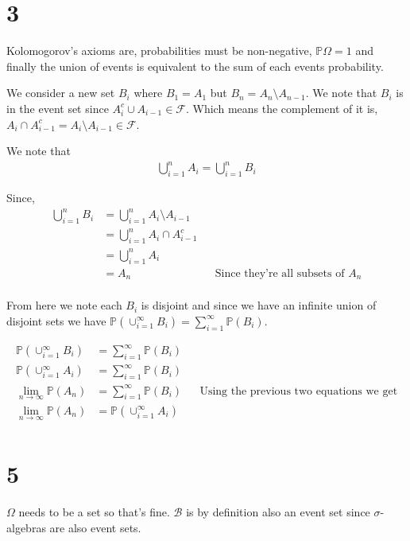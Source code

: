 \documentclass{article}
\newcommand{\prob}{\mathbb{P}}
\begin{document}
\section{3}
Kolomogorov's axioms are,
probabilities must be non-negative,
$\prob{\Omega} = 1$ and finally the union of events
is equivalent to the sum of each events probability.

We consider a new set $B_i$ where $B_1 = A_1$ but $B_n = A_n \setminus A_{n-1}$.
We note that $B_i$ is in the event set since $A_i^c \cup A_{i-1} \in \mathcal{F}$.
Which means the complement of it is, $A_i \cap A_{i-1}^c = A_i \setminus A_{i-1} \in \mathcal{F}$.

We note that 
\begin{align*}
    \bigcup_{i=1}^n A_i = \bigcup_{i=1}^n B_i
\end{align*}

Since,
\begin{align*}
    \bigcup_{i=1}^n B_i &= \bigcup_{i=1}^n A_{i} \setminus A_{i-1} \\
    &= \bigcup_{i=1}^n A_{i} \cap A_{i-1}^c \\
    &= \bigcup_{i=1}^n A_{i} \\
    &= A_{n}
    && \text{Since they're all subsets of $A_n$} \\
\end{align*}

From here we note each $B_i$ is disjoint and since we have an infinite union
of disjoint sets we have $\prob(\cup_{i=1}^\infty B_i) = \sum_{i=1}^\infty \prob(B_i)$.

\begin{align*}
    \prob(\cup_{i=1}^\infty B_i) &= \sum_{i=1}^\infty \prob(B_i) \\
    \prob(\cup_{i=1}^\infty A_i) &= \sum_{i=1}^\infty \prob(B_i) \\
    \lim_{n\to \infty} \prob(A_n) &= \sum_{i=1}^\infty \prob(B_i)
    && \text{Using the previous two equations we get} \\
    \lim_{n\to \infty} \prob(A_n) &= \prob(\cup_{i=1}^\infty A_i) \\
\end{align*}

\section{5}
$\Omega$ needs to be a set so that's fine.
$\mathscr{B}$ is by definition also an event set since
$\sigma$-algebras are also event sets.
\end{document}
